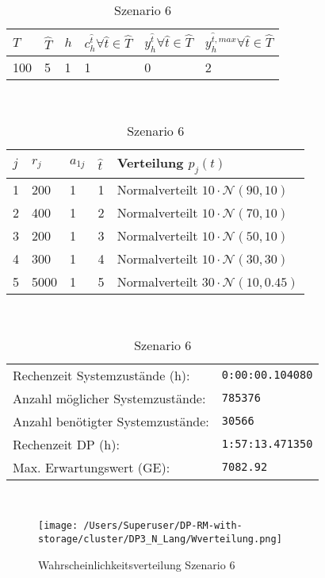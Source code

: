 \begin{table}[h!]
\renewcommand{\arraystretch}{1.5}
  \begin{center}
    \caption{Szenario 6}  \label{S6}
    \vspace*{3mm}
    \begin{tabular}{l l l l l l}   %
    $T$ & $\hat T$  & $h$ & $c_h^{\hat t}\forall \hat{t}\in{\hat T}$ & $y_h^{\hat t}\forall \hat{t}\in{\hat T}$  & $y_h^{{\hat t},max}\forall \hat{t}\in{\hat T}$  \\  \hline
100 & 5 & 1 & 1 & 0 & 2  \\ \hline
    \end{tabular} \\[3mm]
        \begin{tabular}{p{1cm} p{1cm} p{1cm}  p{1cm} p{6cm}}   %
    $j$ & $r_j$  & $a_{1j}$ & $\hat t$ & Verteilung $p_j(t)$ \\  \hline
1 & 200 & 1 & 1 & Normalverteilt $10\cdot\mathcal{N}(90, 10)$   \\
2 & 400 & 1 & 2 & Normalverteilt $10\cdot\mathcal{N}(70, 10)$  \\
3 & 200 & 1 & 3 & Normalverteilt $10\cdot\mathcal{N}(50, 10)$  \\
4 & 300 & 1 & 4 & Normalverteilt $10\cdot\mathcal{N}(30, 30)$  \\
5 & 5000 & 1 & 5 & Normalverteilt $30\cdot\mathcal{N}(10, 0.45)$ \\
\hline
    \end{tabular} \\[3mm]
     \begin{tabular}{p{7cm}p{5cm}} \hline
     Rechenzeit Systemzustände (h): & \texttt{0:00:00.104080} \\
     Anzahl möglicher Systemzustände: & \texttt{785376} \\
     Anzahl benötigter Systemzustände: & \texttt{30566} \\ 
     Rechenzeit DP (h): & \texttt{1:57:13.471350} \\ 
          Max. Erwartungswert (GE): & \texttt{7082.92} \\ \hline
         \end{tabular} \\[3mm]
  \end{center}
\end{table}

\begin{figure}[h!]
  \begin{center}
    \texttt{[image: /Users/Superuser/DP-RM-with-storage/cluster/DP3\_N\_Lang/Wverteilung.png]}
    \caption{Wahrscheinlichkeitsverteilung Szenario 6}  \label{SB6}
  \end{center}
\end{figure}

